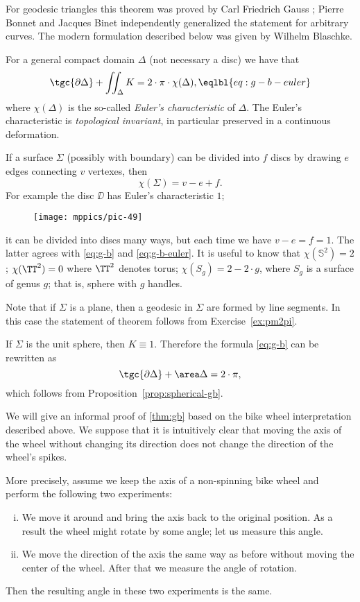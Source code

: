 For geodesic triangles this theorem was proved by Carl Friedrich Gauss \cite{gauss};
Pierre Bonnet and Jacques Binet independently generalized the statement for arbitrary curves. 
The modern formulation described below was given by Wilhelm Blaschke. 


For a general compact domain $\Delta$ (not necessary a disc) we have that
\[\tgc{\partial\Delta}+\iint_{\Delta} K=2\cdot  \pi\cdot\chi(\Delta),\eqlbl{eq:g-b-euler}\]
where $\chi(\Delta)$ is the so-called \emph{Euler's characteristic} of $\Delta$.
The Euler's characteristic is \emph{topological invariant}, in particular preserved in a continuous deformation.

If a surface $\Sigma$ (possibly with boundary) can be divided into $f$ discs by drawing $e$ edges connecting $v$ vertexes, then 
\[\chi(\Sigma)=v-e+f.\]
For example the disc $\DD$ has Euler's characteristic $1$; 
\begin{figure}[h!]
\vskip-0mm
\centering
\texttt{[image: mppics/pic-49]}
\vskip-0mm
\end{figure}
it can be divided into discs many ways, 
but each time we have $v-e=f=1$.
The latter agrees with \ref{eq:g-b} and \ref{eq:g-b-euler}.
It is useful to know that $\chi(\mathbb{S}^2)=2$; $\chi(\TT^2)=0$ where $\TT^2$ denotes torus; 
$\chi( S_g)=2-2\cdot g$, where $S_g$ is a surface of genus $g$; that is, sphere with $g$ handles.

 Note that if $\Sigma$ is a plane, then a geodesic in $\Sigma$ are formed by line segments.
In this case the statement of theorem follows from Exercise~\ref{ex:pm2pi}.

 If $\Sigma$ is the unit sphere, then $K\equiv1$. Therefore the formula \ref{eq:g-b} can be rewritten as 
\[\tgc{\partial\Delta}+\area\Delta=2\cdot \pi,\]
which follows from Proposition~\ref{prop:spherical-gb}.

\medskip

We will give an informal proof of \ref{thm:gb} based on the bike wheel interpretation described above.
We suppose that it is intuitively clear that moving the axis of the wheel without changing its direction does not change the direction of the wheel's spikes.

More precisely, assume we keep the axis of a non-spinning bike wheel and perform the following two experiments:
\begin{enumerate}[(i)]
\item We move it around and bring the axis back to the original position. 
As a result the wheel might rotate by some angle; let us measure this angle.

\item
We move the direction of the axis the same way as before without moving the center of the wheel.
After that we measure the angle of rotation.
\end{enumerate}
Then the resulting angle in these two experiments is the same. 

